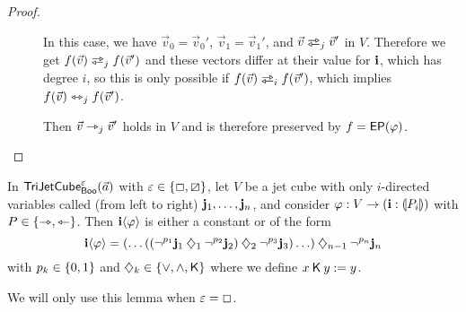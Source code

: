 \documentclass[a4paper]{memoir}
\begin{document}
\begin{proof}
\begin{description}
		\item[] In this case, we have $\vec v_0 = \vec v_0'$, $\vec v_1 = \vec v_1'$, and $\vec v \infrajet_j \vec v'$ in $V$.
		Therefore we get $f(\vec v) \infrajet_j f(\vec v')$ and these vectors differ at their value for $\mathbf{i}$, which has degree $i$, so this is only possible if $f(\vec v) \infrajet_i f(\vec v')$, which implies $f(\vec v) \leftrightarrowtriangle_j f(\vec v')$.
		
		\item[] Then $\vec v \rightarrowtriangle_j \vec v'$ holds in $V$ and is therefore preserved by $f = \mathsf{EP}(\varphi)$. \qedhere
	\end{description}
\end{proof}
\begin{lemma} \label{thm:char-twisted-cube-to-line}
	In $\mathsf{TriJetCube}^{\varepsilon}_{\mathsf{Boo}}\mathopen{}\left( \vec a \right)\mathclose{}$ with $\varepsilon \in \mathopen{}\left\{ \Box, \boxslash \right\}\mathclose{}$, let $V$ be a jet cube with only $i$-directed variables called (from left to right) $\mathbf{j}_1, \ldots, \mathbf{j}_n$, and consider $\varphi : V \to (\mathbf{i} : {\llparenthesis P_i \rrparenthesis})$ with $P \in \mathopen{}\left\{ \rightarrowtriangle, \leftarrowtriangle \right\}\mathclose{}$.
	Then $\mathbf{i} \langle \varphi \rangle$ is either a constant or of the form
	\[
		\mathbf{i} \langle \varphi \rangle = (\ldots((\lnot^{p_1} \mathbf{j}_1 \mathbin{\diamondsuit}_1 \lnot^{p_2} \mathbf{j}_2) \mathbin{\diamondsuit}_2 \lnot^{p_3} \mathbf{j}_3) \ldots) \mathbin{\diamondsuit}_{n-1} \lnot^{p_n} \mathbf{j}_n
	\]
	with $p_k \in \mathopen{}\left\{ 0, 1 \right\}\mathclose{}$ and $\mathbin{\diamondsuit}_k \in \mathopen{}\left\{ {\vee}, {\wedge}, {\mathbin{\mathsf{K}}} \right\}\mathclose{}$ where we define $x \mathbin{\mathsf{K}} y := y$.
\end{lemma}
We will only use this lemma when $\varepsilon = \Box$.
\end{document}
